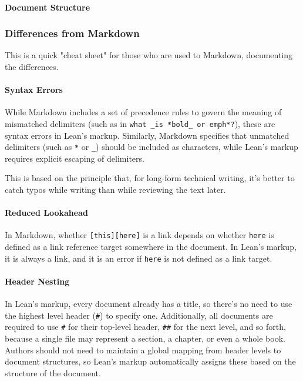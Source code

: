 \documentclass{memoir}
\begin{document}
\paragraph{Document Structure}



\subsubsection{Differences from Markdown}

This is a quick "cheat sheet" for those who are used to Markdown, documenting the differences.



\paragraph{Syntax Errors}

While Markdown includes a set of precedence rules to govern the meaning of mismatched delimiters (such as in \Verb|what _is *bold_ or emph*?|), these are syntax errors in Lean's markup.
Similarly, Markdown specifies that unmatched delimiters (such as \Verb|*| or \Verb|_|) should be included as characters, while Lean's markup requires explicit escaping of delimiters.

This is based on the principle that, for long-form technical writing, it's better to catch typos while writing than while reviewing the text later.



\paragraph{Reduced Lookahead}

In Markdown, whether \Verb|[this][here]| is a link depends on whether \Verb|here| is defined as a link reference target somewhere in the document.
In Lean's markup, it is always a link, and it is an error if \Verb|here| is not defined as a link target.



\paragraph{Header Nesting}

In Lean's markup, every document already has a title, so there's no need to use the highest level header (\Verb|#|) to specify one.
Additionally, all documents are required to use \Verb|#| for their top-level header, \Verb|##| for the next level, and so forth, because a single file may represent a section, a chapter, or even a whole book.
Authors should not need to maintain a global mapping from header levels to document structures, so Lean's markup automatically assigns these based on the structure of the document.
\end{document}
